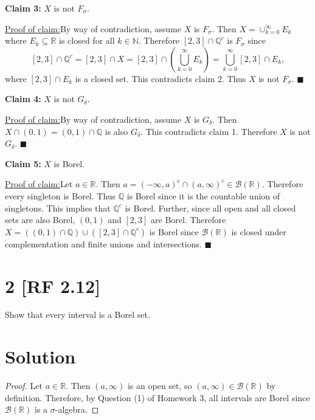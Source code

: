 \documentclass[12pt]{article}
\newenvironment{claimproof}[1]{\par\noindent\underline{Proof of claim:}\space#1}{\hfill $\blacksquare$}
\begin{document}
{\bf Claim 3:} $X$ is not $F_{\sigma}$.
\begin{claimproof}
By way of contradiction, assume $X$ is $F_{\sigma}$. Then $X = \cup_{k=0}^{\infty}E_{k}$ where $E_{k} \subseteq \mathbb{R}$ is closed for all $k \in
\mathbb{N}$. Therefore $[2,3] \cap \mathbb{Q}^{c}$ is $F_{\sigma}$ since
\[ [2,3]\cap\mathbb{Q}^{c} = [2,3]\cap X = [2,3]\cap\left( \bigcup_{k=0}^{\infty}E_{k} \right) = \bigcup_{k=0}^{\infty}[2,3]\cap E_{k}, \]
where $[2,3]\cap E_{k}$ is a closed set. This contradicts claim 2. Thus $X$ is not $F_{\sigma}$.
\end{claimproof}

{\bf Claim 4:} $X$ is not $G_{\delta}$.
\begin{claimproof}
By way of contradiction, assume $X$ is $G_{\delta}$. Then $X \cap (0,1) = (0,1)\cap\mathbb{Q}$ is also $G_{\delta}$. This contradicts claim 1.
Therefore $X$ is not $G_{\delta}$.
\end{claimproof}

{\bf Claim 5:} $X$ is Borel.
\begin{claimproof}
Let $a \in \mathbb{R}$. Then $a = (-\infty, a)^{c} \cap (a, \infty)^{c} \in \mathcal{B}(\mathbb{R})$. Therefore every singleton is Borel. Thus
$\mathbb{Q}$ is Borel since it is the countable union of singletons. This implies that $\mathbb{Q}^{c}$ is Borel. Further, since all open 
and all closed sets are also Borel, $(0,1)$ and $[2,3]$ are Borel. Therefore $X = \left((0,1)\cap\mathbb{Q} \right) \cup \left( [2,3]\cap\mathbb{Q}^{c} 
\right)$ is Borel since $\mathcal{B}(\mathbb{R})$ is closed under complementation and finite unions and intersections.
\end{claimproof}


\newpage
\section*{2 [RF 2.12]}
Show that every interval is a Borel set.

\section*{Solution}
\begin{proof}
Let $a \in \mathbb{R}$. Then $(a, \infty)$ is an open set, so $(a,\infty) \in \mathcal{B}(\mathbb{R})$ by definition. Therefore, by Question (1) of
Homework 3, all intervals are Borel since $\mathcal{B}(\mathbb{R})$ is a $\sigma$-algebra.
\end{proof}
\end{document}
